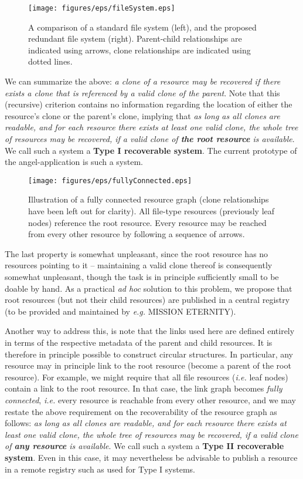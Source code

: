 \documentclass[11pt]{article}
\begin{document}
\begin{mainmatter}
\begin{figure}[ht!]
\texttt{[image: figures/eps/fileSystem.eps]}
\caption{
A comparison of a standard file system (left), and the proposed redundant file system (right). Parent-child relationships are indicated using arrows, clone relationships are indicated using dotted lines.
}
\end{figure}

We can summarize the above: \emph{a clone of a resource may be recovered if there exists a clone that is referenced by a valid clone of the parent}. Note that this (recursive) criterion contains no information regarding the location of either the resource's clone or the parent's clone, implying that \emph{as long as all clones are readable, and for each resource there exists at least one valid clone, the whole tree of resources may be recovered, if a valid clone of \textbf{the root resource} is available}. We call such a system a\label{typeOne} \textbf{Type I recoverable system}. The current prototype of the angel-application is such a system.

\begin{figure}[ht!]
\texttt{[image: figures/eps/fullyConnected.eps]}
\caption{
Illustration of a fully connected resource graph (clone relationships have been left out for clarity). All file-type resources (previously leaf nodes) reference the root resource. Every resource may be reached from every other resource by following a sequence of arrows.
}
\end{figure}

 The last property is somewhat unpleasant, since the root resource has no resources pointing to it -- maintaining a valid clone thereof is consequently somewhat unpleasant, though the task is in principle sufficiently small to be doable by hand. As a practical \emph{ad hoc} solution to this problem, we propose that root resources (but not their child resources) are published in a central registry (to be provided and maintained by \emph{e.g.} MISSION ETERNITY). 

Another way to address this, is note that the links used here are defined entirely in terms of the respective metadata of the parent and child resources. It is therefore in principle possible to construct circular structures. In particular, any resource may in principle link to the root resource (become a parent of the root resource). For example, we might require that all file resources (\emph{i.e.} leaf nodes) contain a link to the root resource. In that case, the link graph becomes \emph{fully connected}, \emph{i.e.} every resource is reachable from every other resource, and we may restate the above requirement on the recoverability of the resource graph as follows: \emph{as long as all clones are readable, and for each resource there exists at least one valid clone, the whole tree of resources may be recovered, if a valid clone of \textbf{any resource} is available}. We call such a system a\label{typeTwo} \textbf{Type II recoverable system}. Even in this case, it may nevertheless be advisable to publish a resource in a remote registry such as used for Type I systems.


\end{mainmatter}
\end{document}
